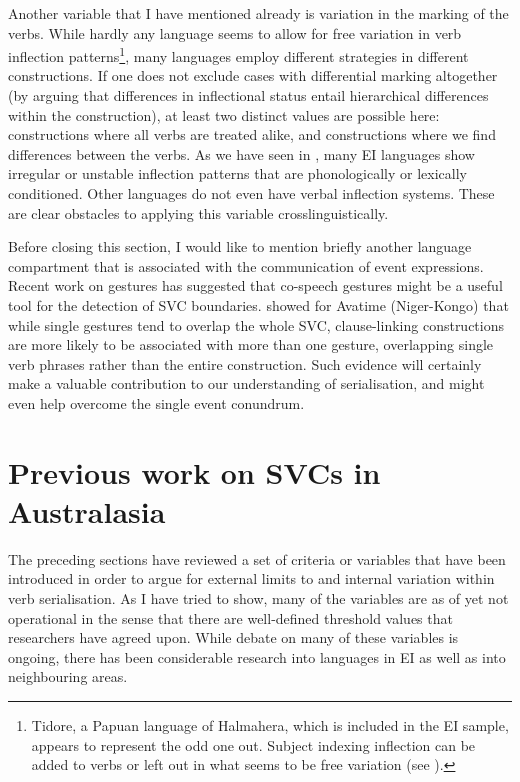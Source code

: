 Another variable that I have mentioned already is variation in the marking of the verbs. While hardly any language seems to allow for free variation in verb inflection patterns\footnote{Tidore, a Papuan language of Halmahera, which is included in the EI sample, appears to represent the odd one out. Subject indexing inflection can be added to verbs or left out in what seems to be free variation (see \citealt{vanstaden2000tidore}).}, many languages employ different strategies in different constructions. If one does not exclude cases with differential marking altogether (by arguing that differences in inflectional status entail hierarchical differences within the construction), at least two distinct values are possible here: constructions where all verbs are treated alike, and constructions where we find differences between the verbs. As we have seen in  , many EI languages show irregular or unstable inflection patterns that are phonologically or lexically conditioned. Other languages do not even have verbal inflection systems. These are clear obstacles to applying this variable crosslinguistically.

Before closing this section, I would like to mention briefly another language compartment that is associated with the communication of event expressions. Recent work on gestures has suggested that co-speech gestures might be a useful tool for the detection of SVC boundaries. \citet{defina2016serial} showed for Avatime (Niger-Kongo) that while single gestures tend to overlap the whole SVC, clause-linking constructions are more likely to be associated with more than one gesture, overlapping single verb phrases rather than the entire construction. Such evidence will certainly make a valuable contribution to our understanding of serialisation, and might even help overcome the single event conundrum.

\section{Previous work on SVCs in Australasia} \label{previouswork}

The preceding sections have reviewed a set of criteria or variables that have been introduced in order to argue for external limits to and internal variation within verb serialisation. As I have tried to show, many of the variables are as of yet not operational in the sense that there are well-defined threshold values that researchers have agreed upon. While debate on many of these variables is ongoing, there has been considerable research into languages in EI as well as into neighbouring areas. 

